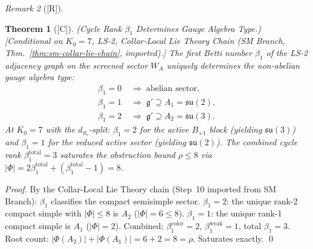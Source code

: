 \documentclass[12pt,oneside]{amsbook}
\theoremstyle{plain}
\newtheorem{theorem}{Theorem}[section]
\theoremstyle{definition}
\theoremstyle{remark}
\newtheorem{remark}[theorem]{Remark}
\newcommand{\status}[1]{\textup{[#1]}}
\begin{document}
\begin{remark}[\status{R}]\label{rem:YM-rate-frontier}


\begin{theorem}[\status{C}]\label{thm:beta1-gauge-type}
\textup{(Cycle Rank $\beta_1$ Determines Gauge Algebra Type.)}
\textup{[Conditional on $K_0=7$, LS-2, Collar-Local Lie Theory Chain
(SM Branch, Thm.~\ref{thm:sm-collar-lie-chain}, imported).]}
The first Betti number $\beta_1$ of the LS-2 adjacency graph
on the screened sector $W_A$ uniquely determines the non-abelian
gauge algebra type:
\begin{align*}
 \beta_1 = 0 &\;\Longrightarrow\; \text{abelian sector},\\
 \beta_1 = 1 &\;\Longrightarrow\; \mathfrak{g}' \supseteq A_1
 = \mathfrak{su}(2),\\
 \beta_1 = 2 &\;\Longrightarrow\; \mathfrak{g}' \supseteq A_2
 = \mathfrak{su}(3).
\end{align*}
At $K_0=7$ with the $d_{S_v}$-split: $\beta_1 = 2$ for the active
$B_{+1}$ block (yielding $\mathfrak{su}(3)$) and $\beta_1 = 1$
for the reduced active sector (yielding $\mathfrak{su}(2)$).
The combined cycle rank $\beta_1^{\mathrm{total}} = 3$ saturates
the obstruction bound $\rho \leq 8$ via $|\Phi| = 2\beta_1^{\mathrm{total}}
+ (\beta_1^{\mathrm{total}} - 1) = 8$.
\end{theorem}

\begin{proof}
By the Collar-Local Lie Theory chain (Step~10 imported from
SM Branch): $\beta_1$ classifies the compact semisimple sector.
$\beta_1 = 2$: the unique rank-2 compact simple with
$|\Phi| \leq 8$ is $A_2$ ($|\Phi| = 6 \leq 8$).
$\beta_1 = 1$: the unique rank-1 compact simple is $A_1$
($|\Phi| = 2$). Combined: $\beta_1^{\mathrm{color}} = 2$,
$\beta_1^{\mathrm{weak}} = 1$, total $\beta_1 = 3$.
Root count: $|\Phi(A_2)| + |\Phi(A_1)| = 6 + 2 = 8 = \rho$.
Saturates exactly. \qed
\end{proof}





\end{remark}
\end{document}

